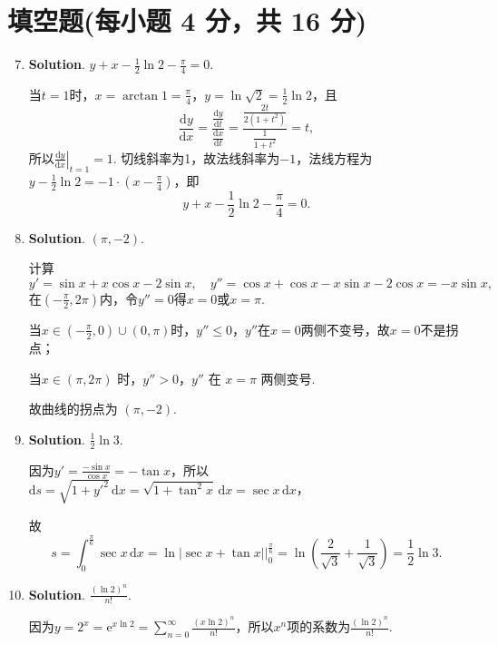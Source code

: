 \documentclass[../main.tex]{subfiles}
\begin{document}
\section{填空题(每小题 4 分，共 16 分)}
\begin{enumerate}
    \setcounter{enumi}{6}
    \item \textbf{Solution}. $y+x-\frac{1}{2}\ln 2-\frac{\pi}{4}=0$.

          当$t=1$时，$x=\arctan 1=\frac{\pi}{4}$，$y=\ln\sqrt{2}=\frac{1}{2}\ln 2$，且
          \[
              \frac{\mathrm{d}y}{\mathrm{d}x}=\frac{\frac{\mathrm{d}y}{\mathrm{d}t}}{\frac{\mathrm{d}x}{\mathrm{d}t}}
              =\frac{\frac{2t}{2(1+t^{2})}}{\frac{1}{1+t^{2}}}=t,
          \]
          所以$\left.\frac{\mathrm{d}y}{\mathrm{d}x}\right|_{t=1}=1$. 切线斜率为1，故法线斜率为$-1$，法线方程为$y-\frac{1}{2}\ln 2=-1\cdot\left(x
              -\frac{\pi}{4}\right)$，即
          \[
              y+x-\frac{1}{2}\ln 2-\frac{\pi}{4}=0.
          \]

    \item \textbf{Solution}. $(\pi,-2)$.

          计算
          \[
              y'=\sin x+x\cos x-2\sin x,\quad y''=\cos x+\cos x-x\sin x-2\cos x=-x\sin x,
          \]
          在$\left(-\frac{\pi}{2},2\pi\right)$内，令$y''=0$得$x=0$或$x=\pi$.

          当$x \in \left(-\frac{\pi}{2}, 0\right)\cup(0, \pi)$时，$y'' \leq 0$，$y''$在$x
              =0$两侧不变号，故$x=0$不是拐点；

          当$x \in (\pi, 2\pi)$ 时，$y'' > 0$，$y''$ 在 $x=\pi$ 两侧变号.

          故曲线的拐点为 $(\pi, -2)$.

    \item \textbf{Solution}. $\frac{1}{2}\ln 3$.

          因为$y'=\frac{-\sin x}{\cos x}=-\tan x$，所以$\mathrm{d}s=\sqrt{1+y'^{2}}\,\mathrm{d}
              x=\sqrt{1+\tan^{2}x}\,\mathrm{d}x=\sec x\,\mathrm{d}x$，

          故
          \[
              s=\int_{0}^{\frac{\pi}{6}}\sec x\,\mathrm{d}x=\ln\left|\sec x+\tan x\right
              |\bigg|_{0}^{\frac{\pi}{6}}=\ln\left(\frac{2}{\sqrt{3}}+\frac{1}{\sqrt{3}}\right
              )=\frac{1}{2}\ln 3.
          \]

    \item \textbf{Solution}. $\frac{(\ln 2)^{n}}{n!}$.

          因为$y=2^{x}=\mathrm{e}^{x\ln 2}=\sum_{n=0}^{\infty}\frac{(x\ln 2)^{n}}{n!}$，所以$x
                  ^{n}$项的系数为$\frac{(\ln 2)^{n}}{n!}$.
\end{enumerate}
\end{document}
